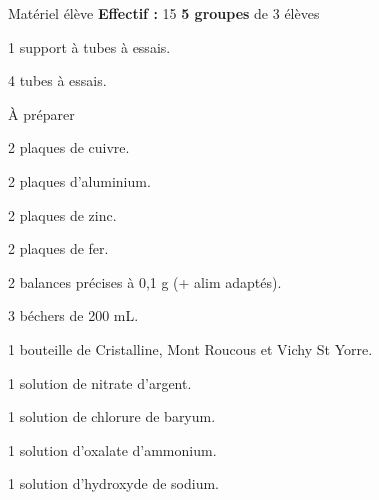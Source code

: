 
\begin{boiteMateriel}{Matériel élève}
  \textbf{Effectif :} 15
  \qq{}\qq{}
  \flecheLongue \textbf{5 groupes} de 3 élèves
  
  \begin{protocole}
    \item 1 support à tubes à essais.
    \item 4 tubes à essais.
  \end{protocole}
\end{boiteMateriel}


\begin{boiteMateriel}{À préparer}
  \begin{protocole}
    \item 2 plaques de cuivre.
    \item 2 plaques d'aluminium.
    \item 2 plaques de zinc.
    \item 2 plaques de fer.
    \item 2 balances précises à 0,1 g (+ alim adaptés).
    \item 3 béchers de 200 mL.
    \item 1 bouteille de Cristalline, Mont Roucous et Vichy St Yorre.
    \item 1 solution de nitrate d'argent.
    \item 1 solution de chlorure de baryum.
    \item 1 solution d'oxalate d'ammonium.
    \item 1 solution d'hydroxyde de sodium.
  \end{protocole}
\end{boiteMateriel}